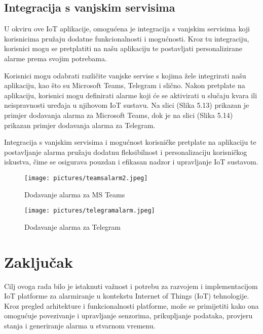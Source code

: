 \documentclass[times, utf8, zavrsni]{fer}
\begin{document}
\section{Integracija s vanjskim servisima}
     U okviru ove IoT aplikacije, omogućena je integracija s vanjskim servisima koji korisnicima pružaju dodatne funkcionalnosti i mogućnosti. Kroz tu integraciju, korisnici mogu se pretplatiti na našu aplikaciju te postavljati personalizirane alarme prema svojim potrebama.

Korisnici mogu odabrati različite vanjske servise s kojima žele integrirati našu aplikaciju, kao što su Microsoft Teams, Telegram i slično. Nakon pretplate na aplikaciju, korisnici mogu definirati alarme koji će se aktivirati u slučaju kvara ili neispravnosti uređaja u njihovom IoT sustavu. Na slici (Slika 5.13) prikazan je primjer dodavanja alarma za Microsoft Teams, dok je na slici (Slika 5.14) prikazan primjer dodavanja alarma za Telegram.

Integracija s vanjskim servisima i mogućnost korisničke pretplate na aplikaciju te postavljanje alarma pružaju dodatnu fleksibilnost i personalizaciju korisničkog iskustva, čime se osigurava pouzdan i efikasan nadzor i upravljanje IoT sustavom.

 \begin{figure}[h]
			\texttt{[image: pictures/teamsalarm2.jpeg]} %
		\centering
			\caption{Dodavanje alarma za MS Teams}
			\label{fig:promjene}
     \end{figure}

      \begin{figure}[h]
			\texttt{[image: pictures/telegramalarm.jpeg]} %
		\centering
			\caption{Dodavanje alarma za Telegram}
			\label{fig:promjene}
     \end{figure}

\chapter{Zaključak}
Cilj ovoga rada bilo je istaknuti važnost i potrebu za razvojem i implementacijom IoT platforme za alarmiranje u kontekstu Internet of Things (IoT) tehnologije. Kroz pregled arhitekture i funkcionalnosti platforme, može se primijetiti kako ona omogućuje povezivanje i upravljanje senzorima, prikupljanje podataka, provjeru stanja i generiranje alarma u stvarnom vremenu.
\end{document}
